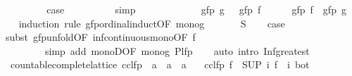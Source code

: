\begin{isabellebody}
\ \ \ \ \ \ \isamarkupfalse%
\ \isamarkupfalse%
\ {\isacharquery}case\isanewline
\ \ \ \ \ \ \ \ \isamarkupfalse%
\ simp\isanewline
\ \ \ \ \isamarkupfalse%
\isanewline
\ \ \isamarkupfalse%
\isanewline
\ \ \isamarkupfalse%
\ \isamarkupfalse%
\ {\isachardoublequoteopen}gfp\ g\ {\isasymle}\ {\isasymalpha}\ {\isacharparenleft}gfp\ f{\isacharparenright}{\isachardoublequoteclose}\ \isacommand{{\isachardot}}\isamarkupfalse%
\isanewline
\isanewline
\ \ \isamarkupfalse%
\ {\isachardoublequoteopen}{\isasymalpha}\ {\isacharparenleft}gfp\ f{\isacharparenright}\ {\isasymle}\ gfp\ g{\isachardoublequoteclose}\isanewline
\ \ \isamarkupfalse%
\ {\isacharparenleft}induction\ rule{\isacharcolon}\ gfp{\isacharunderscore}ordinal{\isacharunderscore}induct{\isacharbrackleft}OF\ mono{\isacharunderscore}g{\isacharbrackright}{\isacharparenright}\isanewline
\ \ \ \ \isamarkupfalse%
\ {\isacharparenleft}{}\ S{\isacharparenright}\ \isamarkupfalse%
\ \isamarkupfalse%
\ {\isacharquery}case\isanewline
\ \ \ \ \ \ \isamarkupfalse%
\ {\isacharparenleft}subst\ gfp{\isacharunderscore}unfold{\isacharbrackleft}OF\ inf{\isacharunderscore}continuous{\isacharunderscore}mono{\isacharbrackleft}OF\ f{\isacharbrackright}{\isacharbrackright}{\isacharparenright}\isanewline
\ \ \ \ \ \ \ \ \ {\isacharparenleft}simp\ add{\isacharcolon}\ monoD{\isacharbrackleft}OF\ mono{\isacharunderscore}g{\isacharbrackright}\ P{\isacharunderscore}lfp{\isacharparenright}\isanewline
\ \ \isamarkupfalse%
\ {\isacharparenleft}auto\ intro{\isacharcolon}\ Inf{\isacharunderscore}greatest{\isacharparenright}\isanewline
{}\isamarkupfalse%
%
\endisatagproof
{\isafoldproof}%
%
\isadelimproof
%
\endisadelimproof
%
\isadelimdocument
%
\endisadelimdocument
%
\isatagdocument
%
\isamarkuptrue%
%
\endisatagdocument
{\isafolddocument}%
%
\isadelimdocument
%
\endisadelimdocument
{}\isamarkupfalse%
\ {\isacharparenleft}\ countable{\isacharunderscore}complete{\isacharunderscore}lattice{\isacharparenright}\ cclfp\ {\isacharcolon}{\isacharcolon}\ {\isachardoublequoteopen}{\isacharparenleft}{\isacharprime}a\ {\isasymRightarrow}\ {\isacharprime}a{\isacharparenright}\ {\isasymRightarrow}\ {\isacharprime}a{\isachardoublequoteclose}\isanewline
\ \ \ {\isachardoublequoteopen}cclfp\ f\ {\isacharequal}\ {\isacharparenleft}SUP\ i{\isachardot}\ {\isacharparenleft}f\ {\isacharcircum}{\isacharcircum}\ i{\isacharparenright}\ bot{\isacharparenright}{\isachardoublequoteclose}\isanewline

\end{isabellebody}

